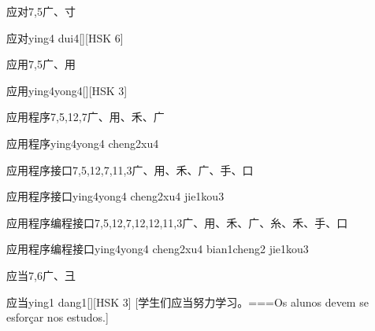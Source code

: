 \begin{Entry}{应对}{7,5}{⼴、⼨}
  \begin{Phonetics}{应对}{ying4 dui4}[][HSK 6]
  \end{Phonetics}
\end{Entry}

\begin{Entry}{应用}{7,5}{⼴、⽤}
  \begin{Phonetics}{应用}{ying4yong4}[][HSK 3]
  \end{Phonetics}
\end{Entry}

\begin{Entry}{应用程序}{7,5,12,7}{⼴、⽤、⽲、⼴}
  \begin{Phonetics}{应用程序}{ying4yong4 cheng2xu4}
  \end{Phonetics}
\end{Entry}

\begin{Entry}{应用程序接口}{7,5,12,7,11,3}{⼴、⽤、⽲、⼴、⼿、⼝}
  \begin{Phonetics}{应用程序接口}{ying4yong4 cheng2xu4 jie1kou3}
  \end{Phonetics}
\end{Entry}

\begin{Entry*}{应用程序编程接口}{7,5,12,7,12,12,11,3}{⼴、⽤、⽲、⼴、⽷、⽲、⼿、⼝}
  \begin{Phonetics}{应用程序编程接口}{ying4yong4 cheng2xu4 bian1cheng2 jie1kou3}
  \end{Phonetics}
\end{Entry*}

\begin{Entry}{应当}{7,6}{⼴、⼹}
  \begin{Phonetics}{应当}{ying1 dang1}[][HSK 3]
    [学生们应当努力学习。===Os alunos devem se esforçar nos estudos.]
  \end{Phonetics}
\end{Entry}

